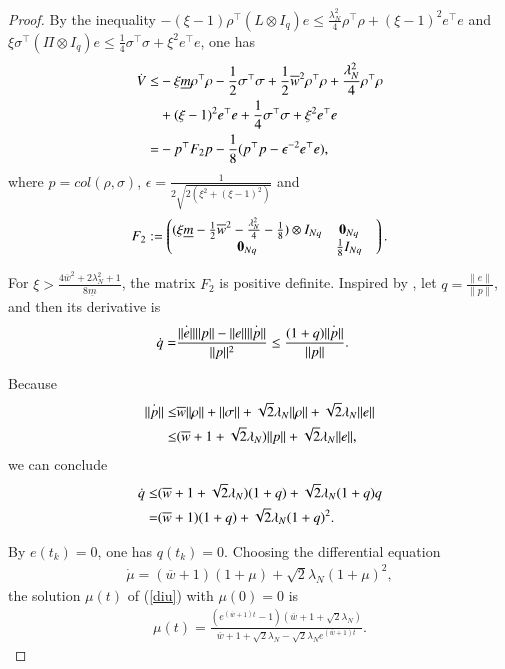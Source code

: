 \documentclass[final,5p,times,twocolumn,authoryear]{elsarticle}
\begin{document}
\begin{proof}
	By the inequality $-(\xi-1)\rho^\top (L\otimes I_q)e
	\le \frac{\lambda_N^2}{4}\rho^\top \rho+(\xi-1)^2e^\top e$
	and
	$\xi\sigma^\top (\Pi\otimes I_q)e
	\le\frac{1}{4}\sigma^\top \sigma + \xi^2e^\top e$, 
	one has
	\begin{align}
		\dot V \le &-\xi\underline m \rho^\top \rho - \frac{1}{2}\sigma^\top \sigma + \frac{1}{2}\overline w^2\rho^\top \rho + \frac{\lambda_N^2}{4}\rho^\top \rho \notag\\
		&+(\xi-1)^2e^\top e + \frac{1}{4}\sigma^\top \sigma + \xi^2e^\top e \notag\\
		=&-p^\top F_2p-\frac{1}{8}(p^\top p-\epsilon^{-2}e^\top e),\label{v2'2}
	\end{align}
	where $p=col(\rho,\sigma)$, $\epsilon=\frac{1}{2\sqrt{2(\xi^2+(\xi-1)^2)}}$ and
	\begin{align}
		F_2:=
		\begin{pmatrix}
			(\xi\underline m-\frac{1}{2}\overline w^2-\frac{\lambda_N^2}{4}-\frac{1}{8})\otimes I_{Nq}& \boldsymbol0_{Nq}& \\
			\boldsymbol0_{Nq}& \frac{1}{8} I_{Nq}& \\
		\end{pmatrix}.\notag
	\end{align}
	
	For $\xi > \frac{4\overline w^2+2\lambda_N^2+1}{8\underline m}$, the matrix $F_2$ is positive definite.
	Inspired by \citet{tran2018}, let $q=\frac{\|e\|}{\|p\|}$, and then its derivative is
	\begin{align}
		\dot q = &\frac{\dot{\| e\|}\|p\|-\|e\|\dot{\| p\|}}{\|p\|^2} 
		\le\frac{(1+q)\dot{\| p\|}}{\|p\|}. \notag
	\end{align}
	
	Because
	\begin{align}
		\dot{\| p\|}\le &\overline w\|\rho\|+\|\sigma\|+\sqrt 2\lambda_N\|\rho\|+\sqrt 2\lambda_N\|e\| \notag\\
		\le&(\overline w + 1 + \sqrt 2\lambda_N)\|p\| + \sqrt 2\lambda_N\|e\|,\notag
	\end{align}
	we can conclude
	\begin{align}
		\dot q \le &(\overline w + 1 + \sqrt 2\lambda_N)(1+q) + \sqrt 2\lambda_N(1+q)q \notag\\
		=&(\overline w + 1)(1+q) + \sqrt 2\lambda_N(1+q)^2.\notag
	\end{align}
	
	By $e(t_k)=0$, one has $q(t_k)=0$. Choosing the differential equation
	\begin{align}
		\dot \mu = (\overline w + 1)(1+\mu) + \sqrt 2\lambda_N(1+\mu)^2,\label{diu}
	\end{align}
	the solution $\mu (t)$ of (\ref{diu}) with $\mu (0)=0$ is
	\begin{align}
		\mu (t) = \frac{(e^{(\overline w + 1)t}-1)(\overline w + 1 + \sqrt 2\lambda_N)}{\overline w + 1 + \sqrt 2\lambda_N - \sqrt 2\lambda_Ne^{(\overline w + 1)t}}.
	\end{align}
	

\end{proof}
\end{document}

